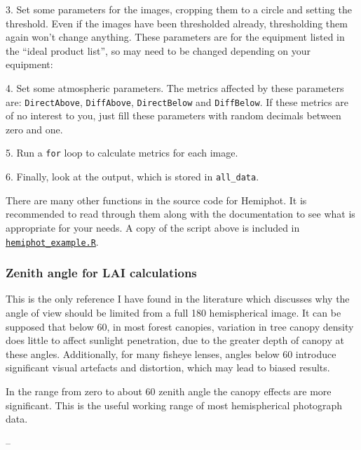 \documentclass[11pt,a4paper]{article}
\newcommand\file[1]{\texttt{\underline{#1}}}  %
\begin{document}
\begin{minipage}{\linewidth}
3. Set some parameters for the images, cropping them to a circle and setting the threshold. Even if the images have been thresholded already, thresholding them again won't change anything. These parameters are for the equipment listed in the ``ideal product list'', so may need to be changed depending on your equipment:

\end{minipage}


\begin{minipage}{\linewidth}
4. Set some atmospheric parameters. The metrics affected by these parameters are: \verb|DirectAbove|, \verb|DiffAbove|, \verb|DirectBelow| and \verb|DiffBelow|. If these metrics are of no interest to you, just fill these parameters with random decimals between zero and one.

\end{minipage}


\begin{minipage}{\linewidth}
5. Run a \verb|for| loop to calculate metrics for each image.

\end{minipage}

6. Finally, look at the output, which is stored in \verb|all_data|.

There are many other functions in the source code for Hemiphot. It is recommended to read through them along with the documentation to see what is appropriate for your needs. A copy of the script above is included in \file{hemiphot\_example.R}.

\subsubsection{Zenith angle for LAI calculations} \label{fov}

This is the only reference I have found in the literature which discusses why the angle of view should be limited from a full 180\textdegree{} hemispherical image. It can be supposed that below 60\textdegree{}, in most forest canopies, variation in tree canopy density does little to affect sunlight penetration, due to the greater depth of canopy at these angles. Additionally, for many fisheye lenses, angles below 60\textdegree{} introduce significant visual artefacts and distortion, which may lead to biased results. 

\begin{minipage}{\linewidth}
\begin{framed}
In the range from zero to about 60 zenith angle the canopy effects are more significant. This is the useful working range of most hemispherical photograph data.

-- \citet{Jupp2009}
\end{framed}
\end{minipage}
\end{document}
